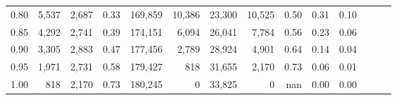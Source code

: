 \begin{tabular}{rrrrrrrrrrrrrr}
0.80 &   5,537 &  2,687 &  0.33 &  169,859 &   10,386 &  23,300 &  10,525 &  0.50 &  0.31 &      0.10 \\
0.85 &   4,292 &  2,741 &  0.39 &  174,151 &    6,094 &  26,041 &   7,784 &  0.56 &  0.23 &      0.06 \\
0.90 &   3,305 &  2,883 &  0.47 &  177,456 &    2,789 &  28,924 &   4,901 &  0.64 &  0.14 &      0.04 \\
0.95 &   1,971 &  2,731 &  0.58 &  179,427 &      818 &  31,655 &   2,170 &  0.73 &  0.06 &      0.01 \\
1.00 &     818 &  2,170 &  0.73 &  180,245 &        0 &  33,825 &       0 &   nan &  0.00 &      0.00 \\
\bottomrule
\end{tabular}
